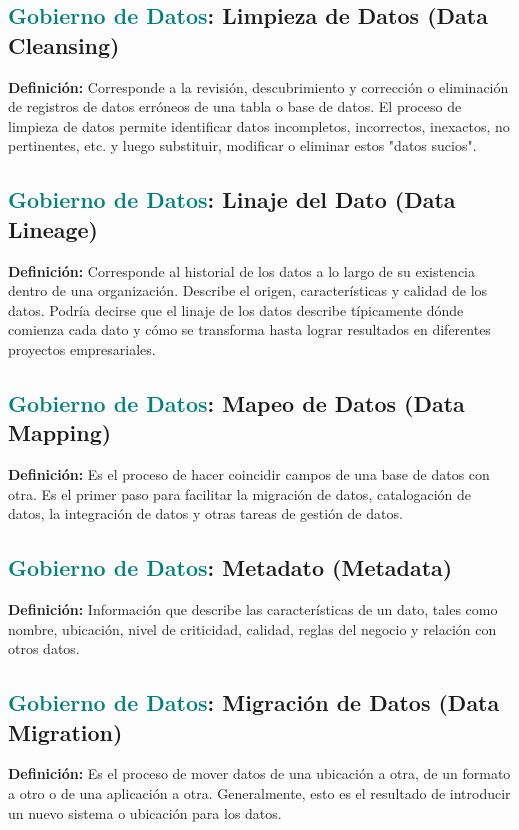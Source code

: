 \documentclass[12pt]{article}
\begin{document}
\subsection{\textcolor{teal}{Gobierno de Datos}: Limpieza de Datos (Data Cleansing)}
\textbf{Definición:} Corresponde a la revisión, descubrimiento y corrección o eliminación de registros de datos erróneos de una tabla o base de datos. El proceso de limpieza de datos permite identificar datos incompletos, incorrectos, inexactos, no pertinentes, etc. y luego substituir, modificar o eliminar estos "datos sucios".
\subsection{\textcolor{teal}{Gobierno de Datos}: Linaje del Dato (Data Lineage) }
\textbf{Definición:} Corresponde al historial de los datos a lo largo de su existencia dentro de una organización. Describe el origen, características y calidad de los datos. Podría decirse que el linaje de los datos describe típicamente dónde comienza cada dato y cómo se transforma hasta lograr resultados en diferentes proyectos empresariales.
\subsection{\textcolor{teal}{Gobierno de Datos}: Mapeo de Datos (Data Mapping)}
\textbf{Definición:} Es el proceso de hacer coincidir campos de una base de datos con otra. Es el primer paso para facilitar la migración de datos, catalogación de datos, la integración de datos y otras tareas de gestión de datos.
\subsection{\textcolor{teal}{Gobierno de Datos}: Metadato (Metadata)}
\textbf{Definición:} Información que describe las características de un dato, tales como nombre, ubicación, nivel de criticidad, calidad, reglas del negocio y relación con otros datos.
\subsection{\textcolor{teal}{Gobierno de Datos}: Migración de Datos (Data Migration)}
\textbf{Definición:} Es el proceso de mover datos de una ubicación a otra, de un formato a otro o de una aplicación a otra. Generalmente, esto es el resultado de introducir un nuevo sistema o ubicación para los datos.
\end{document}
